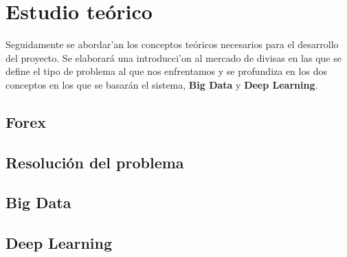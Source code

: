 
\chapter{Estudio te\'orico}\label{cap2}
Seguidamente se abordar'an los conceptos teóricos necesarios para el desarrollo del proyecto. 
Se elaborará una introducci'on al mercado de divisas en las que se define el tipo de problema al que nos enfrentamos y se profundiza en los dos conceptos en los que se basarán el sistema, \textbf{Big Data} y \textbf{Deep Learning}.

\section{Forex}\label{sec:forex}


\section{Resoluci\'on del problema}\label{sec:regresion}



\section{Big Data}\label{sec:bigdata}



\section{Deep Learning}\label{sec:deeplearning}
